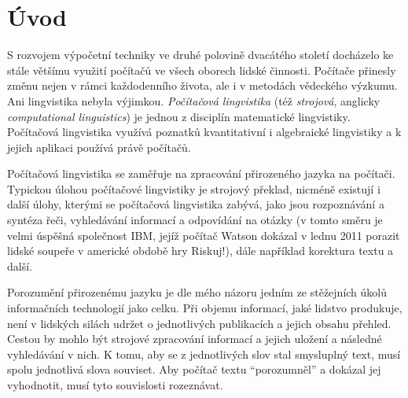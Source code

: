 \documentclass[dp.tex]{subfiles}
\begin{document}
\chapter*{Úvod}
\label{chap:uvod} 






S rozvojem výpočetní techniky ve druhé polovině dvacátého století docházelo ke stále většímu využití počítačů ve všech oborech lidské činnosti. Počítače přinesly změnu nejen v rámci každodenního života, ale i v metodách vědeckého výzkumu. Ani lingvistika nebyla výjimkou. \textit{Počítačová lingvistika} (též \textit{strojová}, anglicky \textit{computational linguistics}) je jednou z disciplín matematické lingvistiky. Počítačová lingvistika využívá poznatků kvantitativní i algebraické lingvistiky a k jejich aplikaci používá právě počítačů. 

Počítačová lingvistika se zaměřuje na zpracování přirozeného jazyka na počítači. Typickou úlohou počítačové lingvistiky je strojový překlad, nicméně existují i další úlohy, kterými se počítačová lingvistika zabývá, jako jsou rozpoznávání a syntéza řeči, vyhledávání informací a odpovídání na otázky (v tomto směru je velmi úspěšná společnost IBM, jejíž počítač Watson dokázal v lednu 2011 porazit lidské soupeře v americké obdobě hry Riskuj!), dále například korektura textu a další.

Porozumění přirozenému jazyku je dle mého názoru jedním ze stěžejních úkolů informačních technologií jako celku. Při objemu informací, jaké lidstvo produkuje, není v lidských silách udržet o jednotlivých publikacích a jejich obsahu přehled. Cestou by mohlo být strojové zpracování informací a jejich uložení a následné vyhledávání v nich. K tomu, aby se z jednotlivých slov stal smysluplný text, musí spolu jednotlivá slova souviset. Aby počítač textu \enquote{porozumněl} a dokázal jej vyhodnotit, musí tyto souvislosti rozeznávat.
\end{document}
